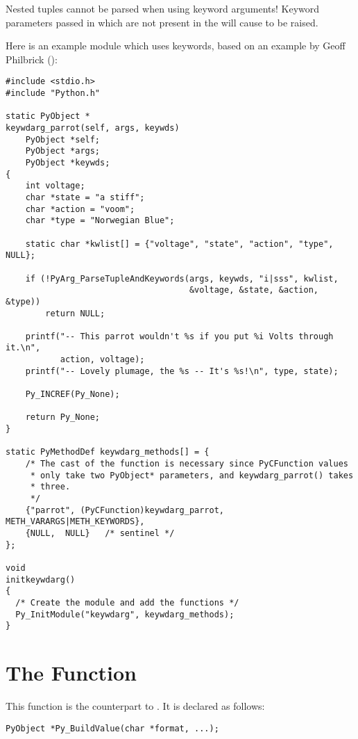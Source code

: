 \documentclass{manual}
\begin{document}
  Nested tuples cannot be parsed when using keyword
arguments!  Keyword parameters passed in which are not present in the
 will cause  to be raised.

Here is an example module which uses keywords, based on an example by
Geoff Philbrick ():%

\begin{verbatim}
#include <stdio.h>
#include "Python.h"

static PyObject *
keywdarg_parrot(self, args, keywds)
    PyObject *self;
    PyObject *args;
    PyObject *keywds;
{  
    int voltage;
    char *state = "a stiff";
    char *action = "voom";
    char *type = "Norwegian Blue";

    static char *kwlist[] = {"voltage", "state", "action", "type", NULL};

    if (!PyArg_ParseTupleAndKeywords(args, keywds, "i|sss", kwlist, 
                                     &voltage, &state, &action, &type))
        return NULL; 
  
    printf("-- This parrot wouldn't %s if you put %i Volts through it.\n", 
           action, voltage);
    printf("-- Lovely plumage, the %s -- It's %s!\n", type, state);

    Py_INCREF(Py_None);

    return Py_None;
}

static PyMethodDef keywdarg_methods[] = {
    /* The cast of the function is necessary since PyCFunction values
     * only take two PyObject* parameters, and keywdarg_parrot() takes
     * three.
     */
    {"parrot", (PyCFunction)keywdarg_parrot, METH_VARARGS|METH_KEYWORDS},
    {NULL,  NULL}   /* sentinel */
};

void
initkeywdarg()
{
  /* Create the module and add the functions */
  Py_InitModule("keywdarg", keywdarg_methods);
}
\end{verbatim}


\section{The  Function
         \label{buildValue}}

This function is the counterpart to .  It is
declared as follows:

\begin{verbatim}
PyObject *Py_BuildValue(char *format, ...);
\end{verbatim}
\end{document}
